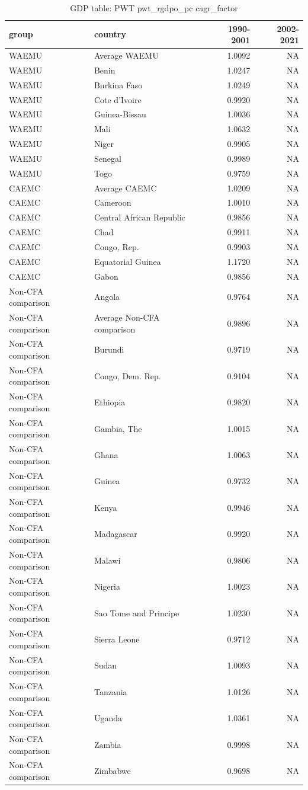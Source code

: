 \begin{table}

\caption{GDP table: PWT pwt_rgdpo_pc cagr_factor}
\centering
\begin{tabular}[t]{llrr}
\toprule
group & country & 1990-2001 & 2002-2021\\
\midrule
WAEMU & Average WAEMU & 1.0092 & NA\\
WAEMU & Benin & 1.0247 & NA\\
WAEMU & Burkina Faso & 1.0249 & NA\\
WAEMU & Cote d'Ivoire & 0.9920 & NA\\
WAEMU & Guinea-Bissau & 1.0036 & NA\\
\addlinespace
WAEMU & Mali & 1.0632 & NA\\
WAEMU & Niger & 0.9905 & NA\\
WAEMU & Senegal & 0.9989 & NA\\
WAEMU & Togo & 0.9759 & NA\\
CAEMC & Average CAEMC & 1.0209 & NA\\
\addlinespace
CAEMC & Cameroon & 1.0010 & NA\\
CAEMC & Central African Republic & 0.9856 & NA\\
CAEMC & Chad & 0.9911 & NA\\
CAEMC & Congo, Rep. & 0.9903 & NA\\
CAEMC & Equatorial Guinea & 1.1720 & NA\\
\addlinespace
CAEMC & Gabon & 0.9856 & NA\\
Non-CFA comparison & Angola & 0.9764 & NA\\
Non-CFA comparison & Average Non-CFA comparison & 0.9896 & NA\\
Non-CFA comparison & Burundi & 0.9719 & NA\\
Non-CFA comparison & Congo, Dem. Rep. & 0.9104 & NA\\
\addlinespace
Non-CFA comparison & Ethiopia & 0.9820 & NA\\
Non-CFA comparison & Gambia, The & 1.0015 & NA\\
Non-CFA comparison & Ghana & 1.0063 & NA\\
Non-CFA comparison & Guinea & 0.9732 & NA\\
Non-CFA comparison & Kenya & 0.9946 & NA\\
\addlinespace
Non-CFA comparison & Madagascar & 0.9920 & NA\\
Non-CFA comparison & Malawi & 0.9806 & NA\\
Non-CFA comparison & Nigeria & 1.0023 & NA\\
Non-CFA comparison & Sao Tome and Principe & 1.0230 & NA\\
Non-CFA comparison & Sierra Leone & 0.9712 & NA\\
\addlinespace
Non-CFA comparison & Sudan & 1.0093 & NA\\
Non-CFA comparison & Tanzania & 1.0126 & NA\\
Non-CFA comparison & Uganda & 1.0361 & NA\\
Non-CFA comparison & Zambia & 0.9998 & NA\\
Non-CFA comparison & Zimbabwe & 0.9698 & NA\\
\bottomrule
\end{tabular}
\end{table}